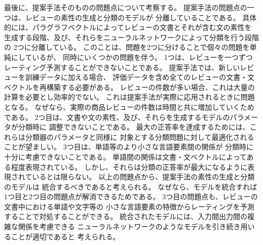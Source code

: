 最後に、提案手法そのものの問題点について考察する。
提案手法の問題点の一つは、レビューの素性の生成と分類のモデルが
分離していることである。
具体的には、パラグラフベクトルによってレビューの文書とそれが含む文の素性を
生成する段階、及び、それらをニューラルネットワークによって分類を行う段階の
2つに分離している。
このことは、問題を2つに分けることで個々の問題を単純にしているが、
同時にいくつかの問題を伴う。
1つは、レビューを一つずつレーティング予測することができないことである。
提案手法では、新しいレビューを訓練データに加える場合、
評価データを含め全てのレビューの文書・文ベクトルを再構築する必要がある。
レビューの件数が多い場合、これは大量の計算を必要とし効率的でない。
これは提案手法が実際に応用されるときに問題となる。
なぜなら、実際の商品レビューの件数は時間と共に増加していくためである。
2つ目は、文書や文の素性、及び、それらを生成するモデルのパラメータが分類時に
調整できないことである。
最大の正答率を達成するためには、これらは分類器のパラメータと同様に
対象とする分類問題に対して最適化されることが望ましい。
3つ目は、単語等のより小さな言語要素間の関係が
分類時に十分に考慮できないことである。
単語間の関係は文書・文ベクトルによってある程度表現されている。
しかし、それらは分類の正答率が最大になるように表現されているとは限らない。
以上の問題点から、提案手法の素性の生成と分類のモデルは
統合するべきであると考えられる。
なぜなら、モデルを統合すれば1つ目と2つ目の問題点が解消できるためである。
3つ目の問題点も、レビューの文書中における単語や文字等の
小さな言語要素の特徴からレーティングを予測することで対処することができる。
統合されたモデルには、入力間出力間の複雑な関係を考慮できる
ニューラルネットワークのようなモデルを引き続き用いることが適切であると
考えられる。
